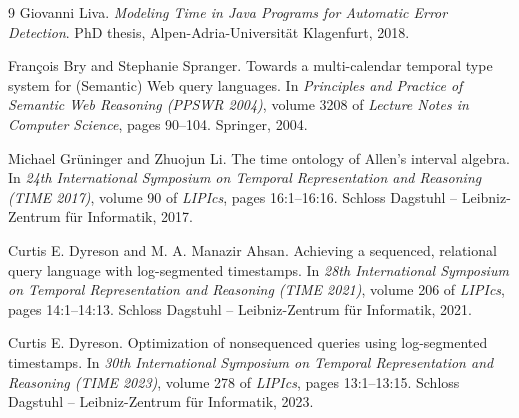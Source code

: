 \begin{thebibliography}{9}
  Giovanni Liva.
  \newblock \emph{Modeling Time in Java Programs for Automatic Error
  Detection}.
  \newblock PhD thesis, Alpen-Adria-Universit\"at Klagenfurt, 2018.

  Fran\c{c}ois Bry and Stephanie Spranger.
  \newblock Towards a multi-calendar temporal type system for
  (Semantic) Web query languages.
  \newblock In \emph{Principles and Practice of Semantic Web
  Reasoning (PPSWR 2004)}, volume 3208 of \emph{Lecture Notes in
  Computer Science}, pages 90--104. Springer, 2004.
  \newblock {}

  Michael Gr\"uninger and Zhuojun Li.
  \newblock The time ontology of Allen's interval algebra.
  \newblock In \emph{24th International Symposium on Temporal
  Representation and Reasoning (TIME 2017)}, volume 90 of
  \emph{LIPIcs}, pages 16:1--16:16. Schloss
  Dagstuhl -- Leibniz-Zentrum f\"ur Informatik, 2017.
  \newblock {}

  Curtis E. Dyreson and M. A. Manazir Ahsan.
  \newblock Achieving a sequenced, relational query language with
  log-segmented timestamps.
  \newblock In \emph{28th International Symposium on Temporal
  Representation and Reasoning (TIME 2021)}, volume 206 of
  \emph{LIPIcs}, pages 14:1--14:13. Schloss
  Dagstuhl -- Leibniz-Zentrum f\"ur Informatik, 2021.
  \newblock {}

  Curtis E. Dyreson.
  \newblock Optimization of nonsequenced queries using log-segmented
  timestamps.
  \newblock In \emph{30th International Symposium on Temporal
  Representation and Reasoning (TIME 2023)}, volume 278 of
  \emph{LIPIcs}, pages 13:1--13:15. Schloss
  Dagstuhl -- Leibniz-Zentrum f\"ur Informatik, 2023.
  \newblock {}

\end{thebibliography}

